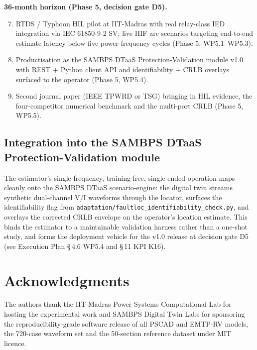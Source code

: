 \documentclass[journal]{IEEEtran}
\begin{document}
\noindent\textbf{36-month horizon (Phase 5, decision gate D5).}
\begin{enumerate}\setcounter{enumi}{6}
  \item RTDS / Typhoon HIL pilot at IIT-Madras with real relay-class
        IED integration via IEC 61850-9-2 SV; live HIF arc scenarios
        targeting end-to-end estimate latency below five
        power-frequency cycles (Phase 5, WP5.1--WP5.3).
  \item Productisation as the SAMBPS DTaaS Protection-Validation
        module v1.0 with REST + Python client API and identifiability
        + CRLB overlays surfaced to the operator
        (Phase 5, WP5.4).
  \item Second journal paper (IEEE TPWRD or TSG) bringing in HIL
        evidence, the four-competitor numerical benchmark and the
        multi-port CRLB (Phase 5, WP5.5).
\end{enumerate}

\subsection{Integration into the SAMBPS DTaaS Protection-Validation
            module}
The estimator's single-frequency, training-free, single-ended
operation maps cleanly onto the SAMBPS DTaaS scenario-engine: the
digital twin streams synthetic dual-channel V/I waveforms through the
locator, surfaces the identifiability flag from
\texttt{adaptation/faultloc\_identifiability\_check.py}, and overlays
the corrected CRLB envelope on the operator's location estimate.
This binds the estimator to a maintainable validation harness rather
than a one-shot study, and forms the deployment vehicle for the v1.0
release at decision gate D5
(see Execution Plan \S\,4.6 WP5.4 and \S\,11 KPI K16).

\section*{Acknowledgments}
The authors thank the IIT-Madras Power Systems Computational Lab for
hosting the experimental work and SAMBPS Digital Twin Labs for
sponsoring the reproducibility-grade software release of all PSCAD
and EMTP-RV models, the 720-case waveform set and the 50-section
reference dataset under MIT licence.



\end{document}
